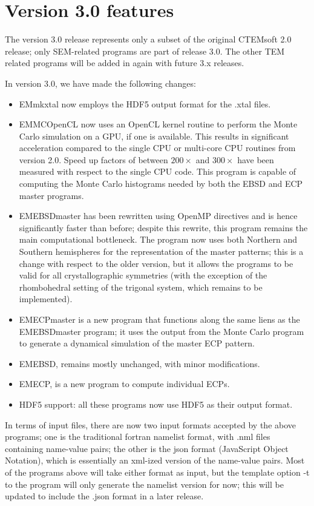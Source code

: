 \documentclass[DIV=calc, paper=letter, fontsize=11pt]{scrartcl}	 %
\begin{document}
\newpage
\section{Version 3.0 features}
The version 3.0 release represents only a subset of the original CTEMsoft 2.0 release; only SEM-related programs are part of release 3.0.  The other TEM related programs 
will be added in again with future 3.x releases.

In version 3.0, we have made the following changes:
\begin{itemize}
	\item \textsf{EMmkxtal} now employs the HDF5 output format for the .xtal files.
	\item \textsf{EMMCOpenCL} now uses an OpenCL kernel routine to perform the Monte Carlo simulation on a GPU, if one is available.  This results in significant acceleration compared to the single CPU or multi-core CPU routines from version 2.0.  Speed up factors of between $200\times$ and $300\times$ have been measured with respect to the single CPU code.  This program is capable of computing the Monte Carlo
	histograms needed by both the EBSD and ECP master programs.
	\item \textsf{EMEBSDmaster} has been rewritten using OpenMP directives and is hence significantly faster than before; despite this rewrite, this program 
	remains the main computational bottleneck.  The program now uses both Northern and Southern hemispheres for the representation of the master patterns; this is a change with respect to the older version, but it allows the programs to be valid for all crystallographic symmetries (with the exception of the rhombohedral setting of the trigonal system, which remains to be implemented).
	\item \textsf{EMECPmaster} is a new program that functions along the same liens as the \textsf{EMEBSDmaster} program; it uses the output from the Monte Carlo program
	to generate a dynamical simulation of the master ECP pattern.
	\item \textsf{EMEBSD}, remains mostly unchanged, with minor modifications.
	\item \textsf{EMECP}, is a new program to compute individual ECPs.
	\item HDF5 support: all these programs now use HDF5 as their output format.
\end{itemize}
In terms of input files, there are now two input formats accepted by the above programs; one is the traditional fortran namelist format, with .nml files containing name-value pairs;
the other is the json format (JavaScript Object Notation), which is essentially an xml-ized version of the name-value pairs.  Most of the programs above will take either format as input, 
but the template option \textsf{-t} to the program will only generate the namelist version for now; this will be updated to include the \textsf{.json} format in a later release.
\end{document}
